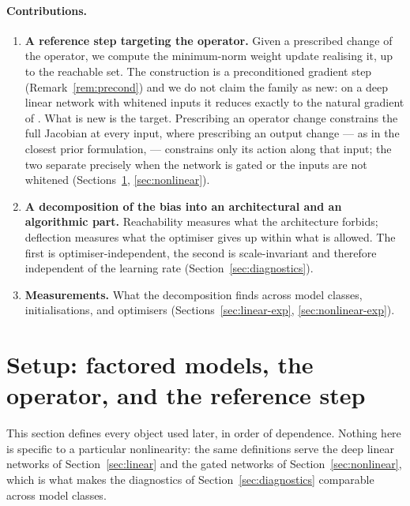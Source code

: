 \documentclass{article} %
\theoremstyle{plain}
\theoremstyle{definition}
\theoremstyle{remark}
\begin{document}
\paragraph{Contributions.}
\begin{enumerate}[label=\textbf{C\arabic*.},leftmargin=*,itemsep=3pt,topsep=3pt]
  \item \textbf{A reference step targeting the operator.} Given a prescribed change of the
        operator, we compute the minimum-norm weight update realising it, up to the reachable set.
        The construction is a preconditioned gradient step (Remark~\ref{rem:precond}) and we do not
        claim the family as new: on a deep linear network with whitened inputs it reduces exactly to
        the natural gradient of \citet{bernacchia2018exact}. What is new is the target. Prescribing
        an operator change constrains the full Jacobian at every input, where prescribing an output
        change --- as in the closest prior formulation, \citet{evans2026theory} --- constrains only
        its action along that input; the two separate precisely when the network is gated or the
        inputs are not whitened (Sections~\ref{sec:setup}, \ref{sec:nonlinear}).
  \item \textbf{A decomposition of the bias into an architectural and an algorithmic part.}
        Reachability measures what the architecture forbids; deflection measures what the
        optimiser gives up within what is allowed. The first is optimiser-independent, the second
        is scale-invariant and therefore independent of the learning rate
        (Section~\ref{sec:diagnostics}).
  \item \textbf{Measurements.} What the decomposition finds across model classes,
        initialisations, and optimisers (Sections~\ref{sec:linear-exp}, \ref{sec:nonlinear-exp}).
\end{enumerate}

\section{Setup: factored models, the operator, and the reference step}
\label{sec:setup}

This section defines every object used later, in order of dependence. Nothing here is specific to
a particular nonlinearity: the same definitions serve the deep linear networks of
Section~\ref{sec:linear} and the gated networks of Section~\ref{sec:nonlinear}, which is what
makes the diagnostics of Section~\ref{sec:diagnostics} comparable across model classes.
\end{document}
